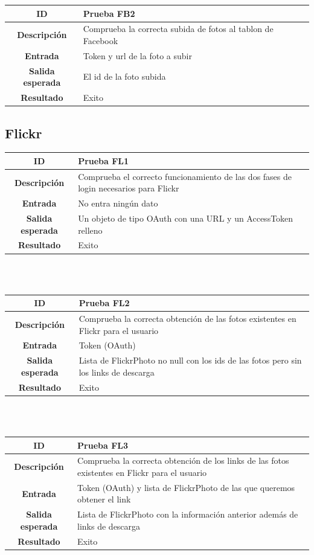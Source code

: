 \documentclass{scrartcl}
\begin{document}
\begin{tabularx}{14cm}{|c|X|}
		\hline \textbf{ID} & Prueba FB2\\ 
		\hline \textbf{Descripción} & Comprueba la correcta subida de fotos al tablon de Facebook \\	 
		\hline  \textbf{Entrada}		& Token y url de la foto a subir \\ 
		\hline  \textbf{Salida esperada}			& El id de la foto subida\\
		\hline  \textbf{Resultado}			& Exito \\
		\hline 
		\end{tabularx} 
\subsection{Flickr}

\begin{tabularx}{14cm}{|c|X|}
	\hline \textbf{ID} & Prueba FL1 \\ 
	\hline \textbf{Descripción} & Comprueba el correcto funcionamiento de las dos fases de login necesarios para Flickr \\	 
	\hline  \textbf{Entrada}		& No entra ningún dato \\ 
	\hline  \textbf{Salida esperada}			& Un objeto de tipo OAuth con una URL y un AccessToken relleno\\
	\hline  \textbf{Resultado}			& Exito \\
	\hline 
\end{tabularx} 
\\
\\

\begin{tabularx}{14cm}{|c|X|}
	\hline \textbf{ID} & Prueba FL2 \\ 
	\hline \textbf{Descripción} & Comprueba la correcta obtención de las fotos existentes en Flickr para el usuario \\	 
	\hline  \textbf{Entrada}		& Token (OAuth) \\ 
	\hline  \textbf{Salida esperada}			& Lista de FlickrPhoto no null con los ids de las fotos pero sin los links de descarga\\
	\hline  \textbf{Resultado}			& Exito \\
	\hline 
\end{tabularx} 
\\
\\

\begin{tabularx}{14cm}{|c|X|}
	\hline \textbf{ID} & Prueba FL3\\ 
	\hline \textbf{Descripción} & Comprueba la correcta obtención de los links de las fotos existentes en Flickr para el usuario \\	 
	\hline  \textbf{Entrada}		& Token (OAuth) y lista de FlickrPhoto de las que queremos obtener el link \\ 
	\hline  \textbf{Salida esperada}			& Lista de FlickrPhoto con la información anterior además de links de descarga\\
	\hline  \textbf{Resultado}			& Exito \\
	\hline 
\end{tabularx} 
\end{document}
